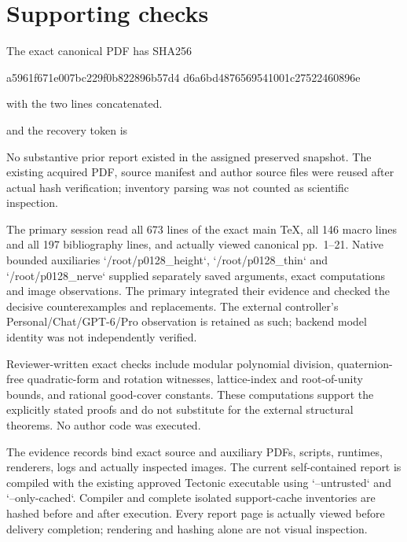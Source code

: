\documentclass[10pt]{article}
\begin{document}
\section*{Supporting checks}
The exact canonical PDF has SHA256\par
a5961f671e007bc229f0b822896b57d4
d6a6bd4876569541001c27522460896e\par
with the two lines concatenated.\par
and the recovery token is\par
No substantive prior report existed in the assigned preserved snapshot. The existing acquired PDF, source manifest and author source files were reused after actual hash verification; inventory parsing was not counted as scientific inspection.\par
The primary session read all 673 lines of the exact main TeX, all 146 macro lines and all 197 bibliography lines, and actually viewed canonical pp. 1–21. Native bounded auxiliaries `/root/p0128\_height`, `/root/p0128\_thin` and `/root/p0128\_nerve` supplied separately saved arguments, exact computations and image observations. The primary integrated their evidence and checked the decisive counterexamples and replacements. The external controller’s Personal/Chat/GPT-6/Pro observation is retained as such; backend model identity was not independently verified.\par
Reviewer-written exact checks include modular polynomial division, quaternion-free quadratic-form and rotation witnesses, lattice-index and root-of-unity bounds, and rational good-cover constants. These computations support the explicitly stated proofs and do not substitute for the external structural theorems. No author code was executed.\par
The evidence records bind exact source and auxiliary PDFs, scripts, runtimes, renderers, logs and actually inspected images. The current self-contained report is compiled with the existing approved Tectonic executable using `--untrusted` and `--only-cached`. Compiler and complete isolated support-cache inventories are hashed before and after execution. Every report page is actually viewed before delivery completion; rendering and hashing alone are not visual inspection.\par
\end{document}
